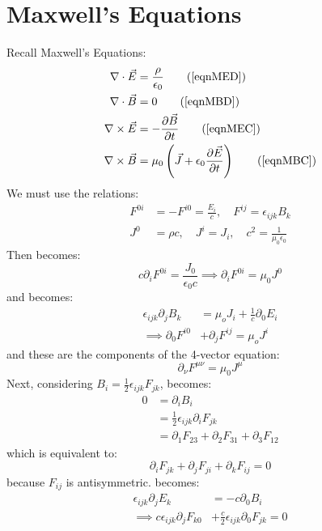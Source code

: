 \documentclass[../Main.tex]{subfiles}
\begin{document}
\section{Maxwell's Equations}
Recall Maxwell's Equations:
\begin{align*}
    \nabla \cdot \vec{E} &= \frac{\rho}{\epsilon_0} \tag{\ref{eqnMED}}\\
    \nabla \cdot \vec{B} &= 0 \tag{\ref{eqnMBD}} \\
    \nabla \times \vec{E} &= -\frac{\partial \vec{B}}{\partial t} \tag{\ref{eqnMEC}} \\
    \nabla \times \vec{B} &= \mu_0 \left(\vec{J} + \epsilon_0 \frac{\partial \vec{E}}{\partial t}\right) \tag{\ref{eqnMBC}}
\end{align*}
We must use the relations:
\begin{align*}
    F^{0i} &= -F^{i0} = \frac{E_i}{c},\quad F^{ij} = \epsilon_{ijk} B_k \\
    J^0 &= \rho c,\quad J^{i} = J_i,\quad c^2 = \frac1{\mu_0 \epsilon_0}
\end{align*}
Then  becomes:
\begin{equation*}
    c \partial_i F^{0i} = \frac{J_0}{\epsilon_0 c} \implies \partial_i F^{0i} = \mu_0 J^0
\end{equation*}
and  becomes:
\begin{align*}
    \epsilon_{ijk} \partial_j B_k &= \mu_o J_i + \frac1c \partial_0 E_i \\
    \implies \partial_0 F^{i0} &+ \partial_j F^{ij} = \mu_o J^i
\end{align*}
and these are the components of the 4-vector equation:
\begin{equation}
    \partial_\nu F^{\mu \nu} = \mu_0 J^\mu
    \label{eqnMR1}
\end{equation}
Next, considering $B_i = \frac12 \epsilon_{ijk} F_{jk}$,  becomes:
\begin{align*}
    0 &= \partial_i B_i \\
    &= \frac12 \epsilon_{ijk} \partial_i F_{jk} \\
    &= \partial_1 F_{23} + \partial_2 F_{31} + \partial_3 F_{12}
\end{align*}
which is equivalent to:
\begin{equation}
    \partial_i F_{jk} + \partial_j F_{ji} + \partial_k F_{ij} = 0
    \label{eqnMaxwellIntermediate}
\end{equation}
because $F_{ij}$ is antisymmetric.  becomes:
\begin{align*}
    \epsilon_{ijk} \partial_j E_k &= -c \partial_0 B_i \\
    \implies c \epsilon_{ijk} \partial_j F_{k0} &+ \frac{c}{2} \epsilon_{ijk} \partial_0 F_{jk} = 0
\end{align*}
\end{document}
